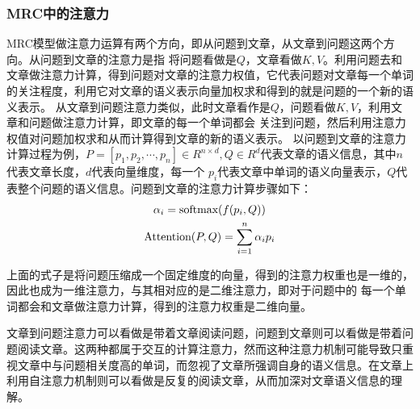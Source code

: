 \subsubsection{MRC中的注意力}
MRC模型做注意力运算有两个方向，即从问题到文章，从文章到问题这两个方向。从问题到文章的注意力是指
将问题看做是$Q$，文章看做$K,V$。利用问题去和文章做注意力计算，得到问题对文章的注意力权值，它代表问题对文章每一个单词的关注程度，利用它对文章的语义表示向量加权求和得到的就是问题的一个新的语义表示。
从文章到问题注意力类似，此时文章看作是$Q$，问题看做$K,V$，利用文章和问题做注意力计算，即文章的每一个单词都会
关注到问题，然后利用注意力权值对问题加权求和从而计算得到文章的新的语义表示。
以问题到文章的注意力计算过程为例，$P=[p_1,p_2,\cdots,p_n] \in R^{n\times d},Q\in R^{d}$代表文章的语义信息，其中$n$代表文章长度，$d$代表向量维度，每一个
$p_i$代表文章中单词的语义向量表示，$Q$代表整个问题的语义信息。问题到文章的注意力计算步骤如下：
\begin{gather}
	\alpha_i=\text{softmax}(f(p_i,Q)) \notag \\
	\text{Attention}(P,Q)=\sum_{i=1}^{n}\alpha_{i}p_i \notag 
\end{gather}

上面的式子是将问题压缩成一个固定维度的向量，得到的注意力权重也是一维的，因此也成为一维注意力，与其相对应的是二维注意力，即对于问题中的
每一个单词都会和文章做注意力计算，得到的注意力权重是二维向量。

文章到问题注意力可以看做是带着文章阅读问题，问题到文章则可以看做是带着问题阅读文章。这两种都属于交互的计算注意力，然而这种注意力机制可能导致只重视文章中与问题相关度高的单词，而忽视了文章所强调自身的语义信息。在文章上利用自注意力机制则可以看做是反复的阅读文章，从而加深对文章语义信息的理解。

